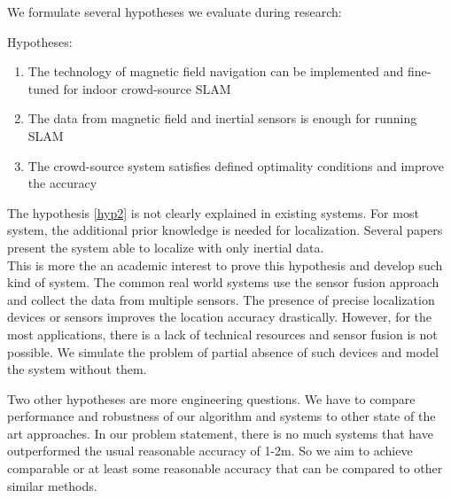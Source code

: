 We formulate several hypotheses we evaluate during research:

Hypotheses:
\begin{enumerate}
	\item The technology of magnetic field navigation can be implemented and fine-tuned for indoor crowd-source SLAM
	\item The data from magnetic field and inertial sensors is enough for running SLAM \label{hyp2}
	\item The crowd-source system satisfies defined optimality conditions and improve the accuracy
\end{enumerate}

The hypothesis \ref{hyp2} is not clearly explained in existing systems. For most system, the additional prior knowledge is needed for localization. Several papers present the system able to localize with only inertial data. \\
This is more the an academic interest to prove this hypothesis and develop such kind of system. The common real world systems use the sensor fusion approach and collect the data from multiple sensors. The presence of precise localization devices or sensors improves the location accuracy drastically. However, for the most applications, there is a lack of technical resources and sensor fusion is not possible. We simulate the problem of partial absence of such devices and model the system without them.

Two other hypotheses are more engineering questions. We have to compare performance and robustness of our algorithm and systems to other state of the art approaches. In our problem statement, there is no much systems that have outperformed the usual reasonable accuracy of 1-2m. So we aim to achieve comparable or at least some reasonable accuracy that can be compared to other similar methods.

%


